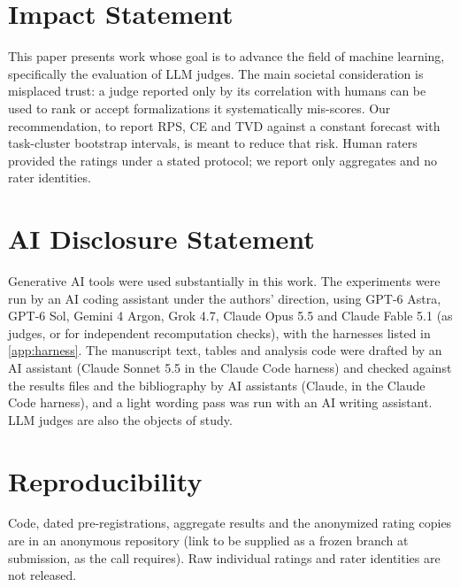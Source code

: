\section*{Impact Statement}
This paper presents work whose goal is to advance the field of machine learning, specifically the evaluation of LLM judges.
The main societal consideration is misplaced trust: a judge reported only by its correlation with humans can be used to rank or accept formalizations it systematically mis-scores.
Our recommendation, to report RPS, CE and TVD against a constant forecast with task-cluster bootstrap intervals, is meant to reduce that risk.
Human raters provided the ratings under a stated protocol; we report only aggregates and no rater identities.

\section*{AI Disclosure Statement}
Generative AI tools were used substantially in this work.
The experiments were run by an AI coding assistant under the authors' direction, using GPT-6 Astra, GPT-6 Sol, Gemini 4 Argon, Grok 4.7, Claude Opus 5.5 and Claude Fable 5.1 (as judges, or for independent recomputation checks), with the harnesses listed in \cref{app:harness}.
The manuscript text, tables and analysis code were drafted by an AI assistant (Claude Sonnet 5.5 in the Claude Code harness) and checked against the results files and the bibliography by AI assistants (Claude, in the Claude Code harness), and a light wording pass was run with an AI writing assistant.
LLM judges are also the objects of study.

\section*{Reproducibility}
Code, dated pre-registrations, aggregate results and the anonymized rating copies are in an anonymous repository (link to be supplied as a frozen branch at submission, as the call requires). Raw individual ratings and rater identities are not released.
